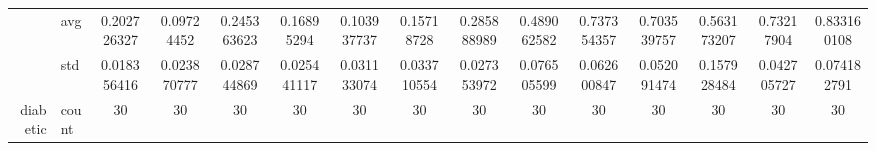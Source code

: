 \begin{table}[htbp]
{\begin{tabular}{rlccc|c|c|c|c|c|ccccc}
			                                                                               & avg                & \cellcolor[rgb]{ .729,  .843,  .502}0.202726327                                & \cellcolor[rgb]{ .388,  .745,  .482}\textcolor[rgb]{ 0,  .38,  0}{0.09724452}  & \cellcolor[rgb]{ .867,  .882,  .51}0.245363623                                 & \cellcolor[rgb]{ .62,  .812,  .494}0.16895294   & \cellcolor[rgb]{ .408,  .749,  .482}0.103937737                                & \cellcolor[rgb]{ .58,  .8,  .49}0.15718728      & \cellcolor[rgb]{ 1,  .922,  .518}0.285888989                                   & \cellcolor[rgb]{ .992,  .733,  .482}0.489062582 & \cellcolor[rgb]{ .98,  .502,  .439}0.737354357  & \cellcolor[rgb]{ .98,  .533,  .443}0.703539757  & \cellcolor[rgb]{ .988,  .667,  .471}0.563173207 & \cellcolor[rgb]{ .98,  .506,  .439}0.73217904   & \cellcolor[rgb]{ .973,  .412,  .42}0.833160108  \\
			                                                                               & std                & 0.018356416                                                                    & 0.023870777                                                                    & 0.028744869                                                                    & 0.025441117                                     & 0.031133074                                                                    & 0.033710554                                     & 0.027353972                                                                    & 0.076505599                                     & 0.062600847                                     & 0.052091474                                     & 0.157928484                                     & 0.042705727                                     & 0.074182791                                     \\
			diabetic                                                                       & count              & 30                                                                             & 30                                                                             & 30                                                                             & 30                                              & 30                                                                             & 30                                              & 30                                                                             & 30                                              & 30                                              & 30                                              & 30                                              & 30                                              & 30                                              \\

\end{tabular}}
\end{table}
